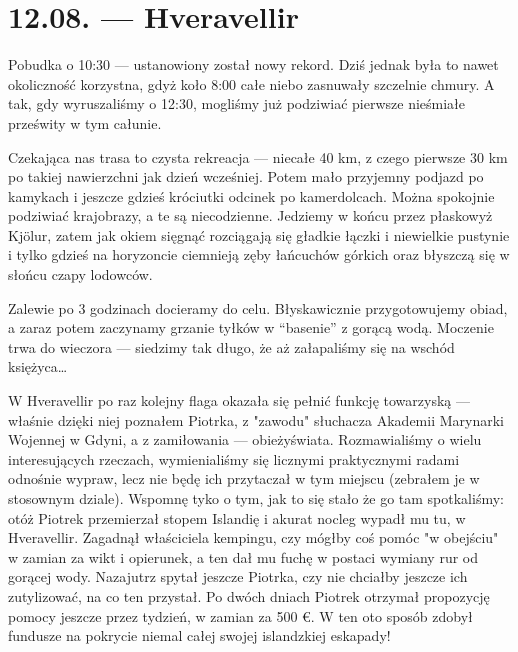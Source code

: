 \chapter*{12.08. --- Hveravellir}

Pobudka o 10:30 --- ustanowiony został nowy rekord. Dziś jednak była to nawet okoliczność korzystna, gdyż koło 8:00 całe niebo zasnuwały szczelnie chmury. A tak, gdy wyruszaliśmy o 12:30, mogliśmy już podziwiać pierwsze nieśmiałe prześwity w tym całunie.

Czekająca nas trasa to czysta rekreacja --- niecałe 40 km, z czego pierwsze 30 km po takiej nawierzchni jak dzień wcześniej. Potem mało przyjemny podjazd po kamykach i jeszcze gdzieś króciutki odcinek po kamerdolcach. Można spokojnie podziwiać krajobrazy, a te są niecodzienne. Jedziemy w końcu przez płaskowyż Kjölur, zatem jak okiem sięgnąć rozciągają się gładkie łączki i niewielkie pustynie i tylko gdzieś na horyzoncie ciemnieją zęby łańcuchów górkich oraz błyszczą się w słońcu czapy lodowców.

Zalewie po 3 godzinach docieramy do celu. Błyskawicznie przygotowujemy obiad, a zaraz potem  zaczynamy grzanie tyłków w “basenie” z gorącą wodą. Moczenie trwa do wieczora --- siedzimy tak długo, że aż załapaliśmy się na wschód księżyca…

W Hveravellir po raz kolejny flaga okazała się pełnić funkcję towarzyską --- właśnie dzięki niej poznałem Piotrka, z "zawodu" słuchacza Akademii Marynarki Wojennej w Gdyni, a z zamiłowania --- obieżyświata. Rozmawialiśmy o wielu interesujących rzeczach, wymienialiśmy się licznymi praktycznymi radami odnośnie wypraw, lecz nie będę ich przytaczał w tym miejscu (zebrałem je w stosownym dziale). Wspomnę tyko o tym, jak to się stało że go tam spotkaliśmy: otóż Piotrek przemierzał stopem Islandię i akurat nocleg wypadł mu tu, w Hveravellir. Zagadnął właściciela kempingu, czy mógłby coś pomóc "w obejściu" w zamian za wikt i opierunek, a ten dał mu fuchę w postaci wymiany rur od gorącej wody. Nazajutrz spytał jeszcze Piotrka, czy nie chciałby jeszcze ich zutylizować, na co ten przystał. Po dwóch dniach Piotrek otrzymał propozycję pomocy jeszcze przez tydzień, w zamian za 500 €. W ten oto sposób zdobył fundusze na pokrycie niemal całej swojej islandzkiej eskapady!


